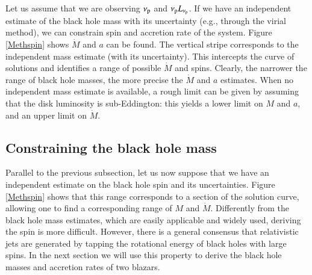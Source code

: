 \documentclass{aa}
\begin{document}
Let us assume that we are observing $\nu_{\rm p}$ and $\nu_{\rm p} L_{\nu_{\rm p}}$. If we have an independent estimate of the black hole mass with its uncertainty (e.g., through the virial method), we can constrain spin and accretion rate of the system. Figure \ref{Methspin} shows $\dot M$ and $a$ can be found. The vertical stripe corresponds to the independent mass estimate (with its uncertainty). This intercepts the curve of solutions and identifies a range of possible $\dot M$ and spins. Clearly, the narrower the range of black hole masses, the more precise the $\dot M$ and $a$ estimates. When no independent mass estimate is available, a rough limit can be given by assuming that the disk luminosity is sub-Eddington: this yields a lower limit on $M$ and $a$, and an upper limit on $\dot{M}$.



\subsection{Constraining the black hole mass} 

Parallel to the previous subsection, let us now suppose that we have an independent estimate on the black hole spin and its uncertainties. Figure \ref{Methspin} shows that this range corresponds to a section of the solution curve, allowing one to find a corresponding range of $M$ and $\dot M$. Differently from the black hole mass estimates, which are easily applicable and widely used, deriving the spin is more difficult. However, there is a general consensus that relativistic jets are generated by tapping the rotational energy of black holes with large spins. In the next section we will use this property to derive the black hole masses and accretion rates of two blazars.








\end{document}
